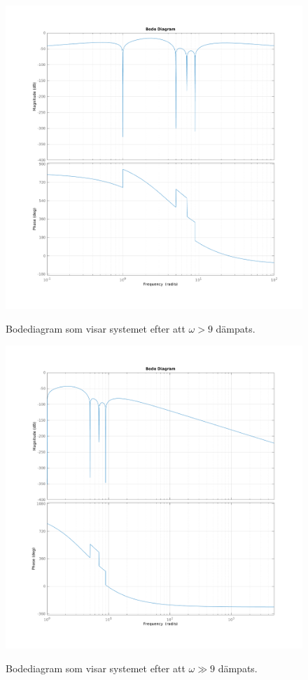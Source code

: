 \begin{figure}
    \caption{Bodediagram som visar systemet efter att $\omega > 9$ dämpats.}
    \centering
    \includegraphics[scale=0.55]{figures/task4b-bode.png}
    \label{fig:task4b-bode}
\end{figure}

\begin{figure}
    \caption{Bodediagram som visar systemet efter att $\omega \gg 9$ dämpats.}
    \centering
    \includegraphics[scale=0.55]{figures/task4c-bode.png}
    \label{fig:task4c-bode}
\end{figure}

